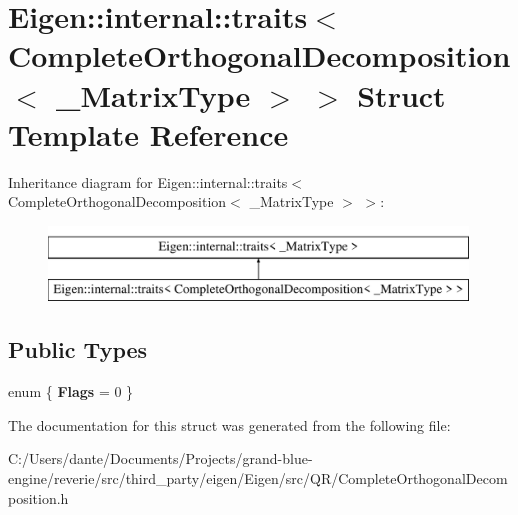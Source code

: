 \hypertarget{struct_eigen_1_1internal_1_1traits_3_01_complete_orthogonal_decomposition_3_01___matrix_type_01_4_01_4}{}\section{Eigen\+::internal\+::traits$<$ Complete\+Orthogonal\+Decomposition$<$ \+\_\+\+Matrix\+Type $>$ $>$ Struct Template Reference}
\label{struct_eigen_1_1internal_1_1traits_3_01_complete_orthogonal_decomposition_3_01___matrix_type_01_4_01_4}
Inheritance diagram for Eigen\+::internal\+::traits$<$ Complete\+Orthogonal\+Decomposition$<$ \+\_\+\+Matrix\+Type $>$ $>$\+:\begin{figure}[H]
\begin{center}
\leavevmode
\includegraphics[height=2.000000cm]{struct_eigen_1_1internal_1_1traits_3_01_complete_orthogonal_decomposition_3_01___matrix_type_01_4_01_4}
\end{center}
\end{figure}
\subsection*{Public Types}
\begin{DoxyCompactItemize}
\item 
\mbox{\label{struct_eigen_1_1internal_1_1traits_3_01_complete_orthogonal_decomposition_3_01___matrix_type_01_4_01_4_a481be46ede05ea140e72aa3ef26a37aa}} 
enum \{ {\bfseries Flags} = 0
 \}
\end{DoxyCompactItemize}


The documentation for this struct was generated from the following file\+:\begin{DoxyCompactItemize}
\item 
C\+:/\+Users/dante/\+Documents/\+Projects/grand-\/blue-\/engine/reverie/src/third\+\_\+party/eigen/\+Eigen/src/\+Q\+R/Complete\+Orthogonal\+Decomposition.\+h\end{DoxyCompactItemize}

